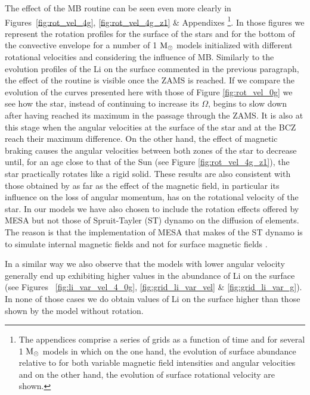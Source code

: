 \documentclass[fleqn,usenatbib]{mnras}
\begin{document}
The effect of the MB routine can be seen even more clearly in Figures~\ref{fig:rot_vel_4g}, \ref{fig:rot_vel_4g_z1} \& Appendixes \footnote{The appendices comprise a series of grids as a function of time and for several 1 $\mathrm{M}_\odot$ models in which on the one hand, the evolution of surface  abundance relative to  for both variable magnetic field intensities and angular velocities and on the other hand, the evolution of surface rotational velocity are shown.}. In those figures we represent the rotation profiles for the surface of the stars and for the bottom of the convective envelope for a number of 1 $\mathrm{M}_\odot$ models initialized with different rotational velocities and considering the influence of MB. Similarly to the evolution profiles of the Li on the surface commented in the previous paragraph, the effect of the routine is visible once the ZAMS is reached. If we compare the evolution of the curves presented here with those of Figure \ref{fig:rot_vel_0g} we see how the star, instead of continuing to increase its $\Omega$, begins to slow down after having reached its maximum in the passage through the ZAMS. It is also at this stage when the angular velocities at the surface of the star and at the BCZ reach their maximum difference. On the other hand, the effect of magnetic braking causes the angular velocities between both zones of the star to decrease until, for an age close to that of the Sun (see Figure \ref{fig:rot_vel_4g_z1}), the star practically rotates like a rigid solid. These results are also consistent with those obtained by \citet{Eggenberger2010} as far as the effect of the magnetic field, in particular its influence on the loss of angular momentum, has on the rotational velocity of the star. In our models we have also chosen to include the rotation effects offered by MESA but not those of Spruit-Tayler (ST) dynamo on the diffusion of elements. The reason is that the implementation of MESA that makes of the ST dynamo is to simulate internal magnetic fields and not for surface magnetic fields \citep{Paxton2013}.

In a similar way we also observe that the models with lower angular velocity generally end up exhibiting higher values in the abundance of Li on the surface (see Figures~ \ref{fig:li_var_vel_4_0g}, \ref{fig:grid_li_var_vel} \& \ref{fig:grid_li_var_g}). In none of those cases we do obtain values of Li on the surface higher than those shown by the model without rotation.\par
\end{document}
